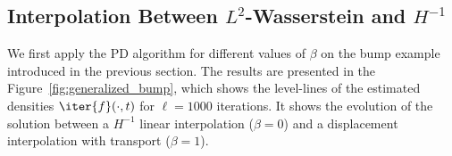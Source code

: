 



\subsection{Interpolation Between $L^2$-Wasserstein and $H^{-1}$}


We first apply the PD algorithm for different values of $\beta$ on the bump example introduced in the previous section. The results are presented in the Figure~\ref{fig:generalized_bump}, which shows the level-lines of the estimated densities $\iter{f}(\cdot,t)$ for $\ell=1000$ iterations. It shows the evolution of the solution between a $H^{-1}$ linear interpolation ($\beta=0$) and a displacement interpolation with transport ($\beta=1$). 




